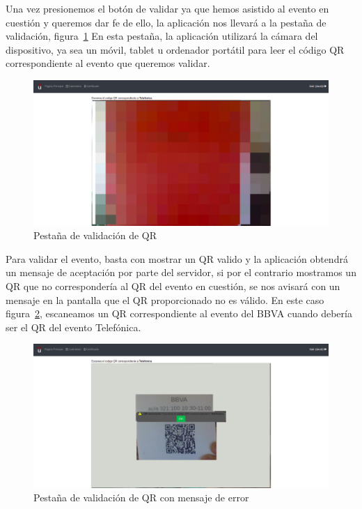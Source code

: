 \documentclass[a4paper, 12pt]{book}
\begin{document}
\begin{enumerate}
\begin{itemize}
	Una vez presionemos el botón de validar ya que hemos asistido al evento en cuestión y queremos dar fe de ello, la aplicación nos llevará a la pestaña de validación, figura~\ref{fig:validarQR}
	En esta pestaña, la aplicación utilizará la cámara del dispositivo, ya sea un móvil, tablet u ordenador portátil para leer el código QR correspondiente al evento que queremos validar.
	\begin{figure}[h!]
  	\centering
  	\includegraphics[width=12cm, keepaspectratio]{img/validarQR.png}
  	\caption{Pestaña de validación de QR}\label{fig:validarQR}
	\end{figure}

Para validar el evento, basta con mostrar un QR valido y la aplicación obtendrá un mensaje de aceptación por parte del servidor, si por el contrario mostramos un QR que no correspondería al QR del evento en cuestión, se nos avisará con un mensaje en la pantalla que el QR proporcionado no es válido. En este caso figura~\ref{fig:validarQRFail}, escaneamos un QR correspondiente al evento del BBVA cuando debería ser el QR del evento Telefónica.

	\begin{figure}[!h]
  	\centering
  	\includegraphics[width=12cm, keepaspectratio]{img/validarQRFail.png}
  	\caption{Pestaña de validación de QR con mensaje de error}\label{fig:validarQRFail}
	\end{figure}  
	

\end{itemize}
\end{enumerate}
\end{document}
